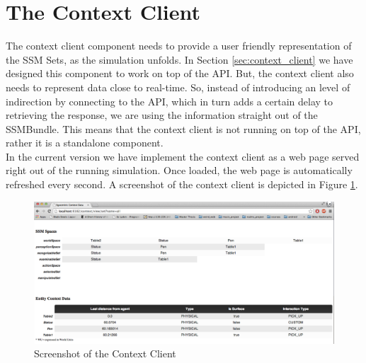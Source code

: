 \section{The Context Client} %
\label{sec:impl_context_client}
The context client component needs to provide a user friendly representation of the SSM Sets, as the simulation unfolds. In Section \ref{sec:context_client} we have designed this component to work on top of the API. But, the context client also needs to represent data close to real-time. So, instead of introducing an level of indirection by connecting to the API, which in turn adds a certain delay to retrieving the response, we are using the information straight out of the SSMBundle. This means that the context client is not running on top of the API, rather it is a standalone component.\\

In the current version we have implement the context client as a web page served right out of the running simulation. Once loaded, the web page is automatically refreshed every second. A screenshot of the context client is depicted in Figure \ref{fig:impl_context_client}.
\begin{figure}[H]
	\centering
	\includegraphics[width=\linewidth]{gfx/Chapter4/context_client}
	\caption{Screenshot of the Context Client}
	\label{fig:impl_context_client}
\end{figure}

